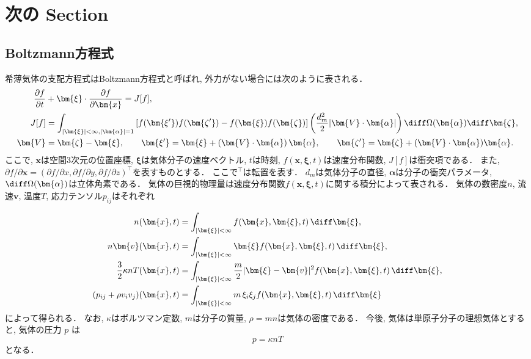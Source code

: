\section{次の Section }

\subsection{Boltzmann方程式}
希薄気体の支配方程式はBoltzmann方程式と呼ばれ, 外力がない場合には次のように表される．
\begin{align}
  \frac{\partial f}{\partial t} &+ \bm{\xi}\cdot\frac{\partial f}{\partial \bm{x}}=J[f], 
    \label{eq:Boltzmann}\\
  J[f] 
    &= \int_{|\bm{\xi}|<\infty,|\bm{\alpha}|=1}
      \left[ f(\bm{\xi^\prime})f(\bm{\zeta^\prime})-f(\bm{\xi})f(\bm{\zeta}) \right] 
      \left( \frac{d_m^2}{2}|\bm{V}\cdot\bm{\alpha}|\right)
      \diff\Omega(\bm{\alpha})\diff\bm{\zeta}, \notag\\
  \bm{V} &= \bm{\zeta} - \bm{\xi}, \qquad
  \bm{\xi^\prime} = \bm{\xi} + \left(\bm{V}\cdot\bm{\alpha}\right)\bm{\alpha}, \qquad
  \bm{\zeta^\prime} = \bm{\zeta} + (\bm{V}\cdot\bm{\alpha})\bm{\alpha}. \notag
\end{align}
ここで, $\bm{x}$は空間3次元の位置座標, $\bm{\xi}$は気体分子の速度ベクトル, $t$は時刻, $f(\bm{x},\bm{\xi},t)$は速度分布関数, $J[f]$は衝突項である．
また, $\partial f/\partial\bm{x}=(\partial f/\partial x,\partial f/\partial y,\partial f/\partial z)^\top$を表すものとする．
ここで${}^\top$は転置を表す．
$d_m$は気体分子の直径, $\bm{\alpha}$は分子の衝突パラメータ, $\diff\Omega(\bm{\alpha})$は立体角素である．
気体の巨視的物理量は速度分布関数$f(\bm{x},\bm{\xi},t)$に関する積分によって表される．
気体の数密度$n$, 流速$\bm{v}$, 温度$T$, 応力テンソル$p_{ij}$はそれぞれ
\begin{subeq}
\begin{align}
  n(\bm{x},t) &= 
    \int_{|\bm{\xi}|<\infty}
    f(\bm{x},\bm{\xi},t) \,\diff\bm{\xi}, \label{eq:n}\\
  n\bm{v}(\bm{x},t) &= 
    \int_{|\bm{\xi}|<\infty}
    \bm{\xi}f(\bm{x},\bm{\xi},t) \,\diff\bm{\xi}, \label{eq:v}\\
  \frac{3}{2} \kappa n T(\bm{x},t) &= 
    \int_{|\bm{\xi}|<\infty}
    \frac{m}{2}|\bm{\xi}-\bm{v}|^2f(\bm{x},\bm{\xi},t) \,\diff\bm{\xi}, 
    \label{eq:T}\\
  (p_{ij}+\rho v_iv_j)(\bm{x},t) &= 
    \int_{|\bm{\xi}|<\infty}
    m\,\xi_i\xi_jf(\bm{x},\bm{\xi},t)\,\diff\bm{\xi} \label{eq:pij}
\end{align}
によって得られる．
なお, $\kappa$はボルツマン定数, $m$は分子の質量, $\rho=mn$は気体の密度である．
今後, 気体は単原子分子の理想気体とすると, 気体の圧力 $p$ は
\begin{equation}
  p = \kappa nT \label{eq:p}
\end{equation}
となる．
\end{subeq}

